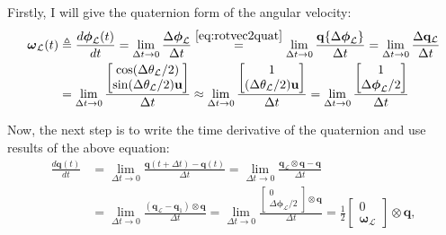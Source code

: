 Firstly, I will give the quaternion form of the angular velocity:
\begin{equation}
\begin{aligned}
    \boldsymbol{\omega}_\mathcal{L}(t)&\triangleq\frac{d\boldsymbol{\phi}_\mathcal{L}(t)}{dt}=\lim_{\Delta t\rightarrow 0}\frac{\Delta\boldsymbol{\phi}_\mathcal{L}}{\Delta t} \stackrel{\eqref{eq:rotvec2quat}}{=}\lim_{\Delta t\rightarrow 0}\frac{\mathbf{q}\{\Delta\boldsymbol{\phi}_\mathcal{L}\}}{\Delta t}=\lim_{\Delta t\rightarrow 0}\frac{\Delta\mathbf{q}_\mathcal{L}}{\Delta t}\\
    &=\lim_{\Delta t\rightarrow 0}\frac{\begin{bmatrix} \cos(\Delta\theta_\mathcal{L}/2) \\ \sin(\Delta\theta_\mathcal{L}/2)\mathbf{u}
    \end{bmatrix}}{\Delta t}\approx\lim_{\Delta t\rightarrow 0}\frac{\begin{bmatrix} 1 \\ (\Delta\theta_\mathcal{L}/2)\mathbf{u}
    \end{bmatrix}}{\Delta t}=\lim_{\Delta t\rightarrow 0}\frac{\begin{bmatrix} 1 \\ \Delta\boldsymbol{\phi}_\mathcal{L}/2
    \end{bmatrix}}{\Delta t}
\end{aligned}
\end{equation}

Now, the next step is to write the time derivative of the quaternion and use results of the above equation:
\begin{equation}
\begin{aligned}
    \frac{d\mathbf{q}(t)}{dt}&=\lim_{\Delta t\rightarrow 0}\frac{\mathbf{q}(t+\Delta t)-\mathbf{q}(t)}{\Delta t}=\lim_{\Delta t\rightarrow 0}\frac{\mathbf{q}_\mathcal{L} \otimes \mathbf{q}-\mathbf{q}}{\Delta t} \\ &=
    \lim_{\Delta t\rightarrow 0}\frac{(\mathbf{q}_\mathcal{L}-\mathbf{q}_1)\otimes\mathbf{q}}{\Delta t}=\lim_{\Delta t\rightarrow 0}\frac{\begin{bmatrix}
        0 \\ \Delta\boldsymbol{\phi}_\mathcal{L}/2
    \end{bmatrix} \otimes \mathbf{q}}{\Delta t}=\frac{1}{2}\begin{bmatrix}
        0 \\ \boldsymbol{\omega}_\mathcal{L}
    \end{bmatrix}\otimes\mathbf{q},
\end{aligned}
\label{eq:quat-derivative}
\end{equation}

